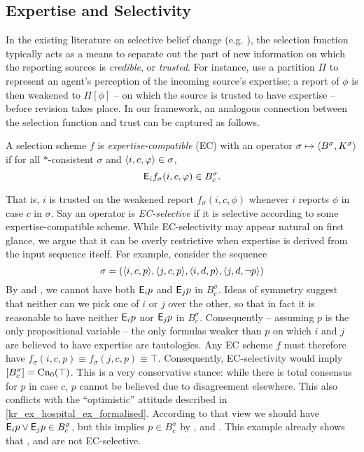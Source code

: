 \subsection{Expertise and Selectivity}

In the existing literature on selective belief change (e.g.
\cite{ferme1999selective,booth_trust_2018}), the selection function typically
acts as a means to separate out the part of new information on which the
reporting sources is \emph{credible}, or \emph{trusted}. For instance,
\textcite{booth_trust_2018} use a partition $\Pi$ to represent an agent's
perception of the incoming source's expertise; a report of $\phi$ is then
weakened to $\Pi[\phi]$ -- on which the source is trusted to have expertise --
before revision takes place. In our framework, an analogous connection between
the selection function and trust can be captured as follows.

\begin{definition}
    \label{kr_def_ec_scheme}
    A selection scheme $f$ is \emph{expertise-compatible} (EC) with an operator
    $\sigma \mapsto \langle {B^\sigma, K^\sigma} \rangle$ if for all $\ast$-consistent
    $\sigma$ and $\langle {i, c, \varphi} \rangle \in \sigma$,
    \[
        \mathsf{E}_i{f_\sigma(i, c, \varphi)} \in B^\sigma_c.
    \]
\end{definition}

That is, $i$ is trusted on the weakened report $f_\sigma(i, c, \phi)$ whenever
$i$ reports $\phi$ in case $c$ in $\sigma$.
%
Say an operator is \emph{EC-selective} if it is selective according to some
expertise-compatible scheme. While EC-selectivity may appear natural on first
glance, we argue that it can be overly restrictive when expertise is derived
from the input sequence itself. For example, consider the sequence
\[
    \sigma = (
        \langle {i, c, p} \rangle,
        \langle {j, c, p} \rangle,
        \langle {i, d, p} \rangle,
        \langle {j, d, \neg p} \rangle
    )
\]
By \soundness{} and \closure{}, we cannot have both $\mathsf{E}_i{p}$ and $\mathsf{E}_j{p}$ in
$B^\sigma_c$. Ideas of symmetry suggest that neither can we pick one of $i$ or
$j$ over the other, so that in fact it is reasonable to have neither $\mathsf{E}_i{p}$
nor $\mathsf{E}_j{p}$ in $B^\sigma_c$. Consequently -- assuming $p$ is the only
propositional variable -- the only formulas weaker than $p$ on which $i$ and
$j$ are believed to have expertise are tautologies. Any EC scheme $f$ must
therefore have $f_\sigma(i, c, p) \equiv f_\sigma(j, c, p) \equiv \top$.
Consequently, EC-selectivity would imply $\left[{B^\sigma_c}\right] =
\operatorname{Cn}_0(\top)$. This is a very conservative stance: while there is total
consensus for $p$ in case $c$, $p$ cannot be believed due to disagreement
elsewhere. This also conflicts with the ``optimistic'' attitude described in
\cref{kr_ex_hospital_ex_formalised}. According to that view we should have
$\mathsf{E}_i{p}
\lor \mathsf{E}_j{p} \in B^\sigma_c$, but this implies $p \in B^\sigma_c$ by
\soundness{}, \containment{} and \closure{}.
%
This example already shows that \varbasedcond{}, \partbasedcond{} and
\scorebasedop{} are not EC-selective.

